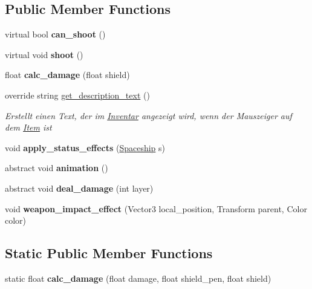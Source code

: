 \subsection*{Public Member Functions}
\begin{DoxyCompactItemize}
\item 
\mbox{\label{class_weapon_a06a50cad5241d643d24075e5409bd93c}} 
virtual bool {\bfseries can\+\_\+shoot} ()
\item 
\mbox{\label{class_weapon_ae3c1382d612bdbb63d0b9fe3ef161ce0}} 
virtual void {\bfseries shoot} ()
\item 
\mbox{\label{class_weapon_aaf86830a709d47b10586724061067efa}} 
float {\bfseries calc\+\_\+damage} (float shield)
\item 
override string \hyperlink{class_weapon_a8fcfb4f08ea22a8fc60790770a58b985}{get\+\_\+description\+\_\+text} ()
\begin{DoxyCompactList}\small\item\em Erstellt einen Text, der im \hyperlink{class_inventar}{Inventar} angezeigt wird, wenn der Mauszeiger auf dem \hyperlink{class_item}{Item} ist \end{DoxyCompactList}\item 
\mbox{\label{class_weapon_a01d002a5119acc492e945271fed9b027}} 
void {\bfseries apply\+\_\+status\+\_\+effects} (\hyperlink{class_spaceship}{Spaceship} s)
\item 
\mbox{\label{class_weapon_a0372c426e01d2c235e33cfcec4ad43ba}} 
abstract void {\bfseries animation} ()
\item 
\mbox{\label{class_weapon_a3624e6919a144a759f997425c3986327}} 
abstract void {\bfseries deal\+\_\+damage} (int layer)
\item 
\mbox{\label{class_weapon_a2a9005a2ba190f919f4d6dfcd351e097}} 
void {\bfseries weapon\+\_\+impact\+\_\+effect} (Vector3 local\+\_\+position, Transform parent, Color color)
\end{DoxyCompactItemize}
\subsection*{Static Public Member Functions}
\begin{DoxyCompactItemize}
\item 
\mbox{\label{class_weapon_ac282a936305d6373091195527e339355}} 
static float {\bfseries calc\+\_\+damage} (float damage, float shield\+\_\+pen, float shield)
\end{DoxyCompactItemize}

